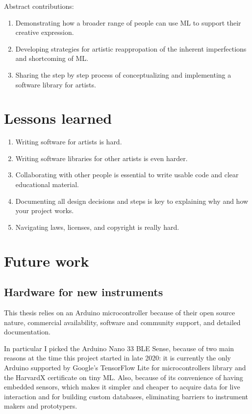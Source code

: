 Abstract contributions:

\begin{enumerate}
 \item Demonstrating how a broader range of people can use \acrshort{ML} to support their creative expression.
 \item Developing strategies for artistic reappropation of the inherent imperfections and shortcoming of \acrshort{ML}.
 \item Sharing the step by step process of conceptualizing and implementing a software library for artists.
\end{enumerate}

\section{Lessons learned}

\begin{enumerate}
  \item Writing software for artists is hard.
  \item Writing software libraries for other artists is even harder.
  \item Collaborating with other people is essential to write usable code and clear educational material.
  \item Documenting all design decisions and steps is key to explaining why and how your project works.
  \item Navigating laws, licenses, and copyright is really hard.
\end{enumerate}

\section{Future work}

\subsection{Hardware for new instruments}

This thesis relies on an Arduino microcontroller because of their open source nature, commercial availability, software and community support, and detailed documentation.

In particular I picked the Arduino Nano 33 \acrshort{BLE} Sense, because of two main reasons at the time this project started in late 2020: it is currently the only Arduino supported by Google's TensorFlow Lite for microcontrollers library and the HarvardX certificate on tiny \acrshort{ML}. Also, because of its convenience of having embedded sensors, which makes it simpler and cheaper to acquire data for live interaction and for building custom databases, eliminating barriers to instrument makers and prototypers.

